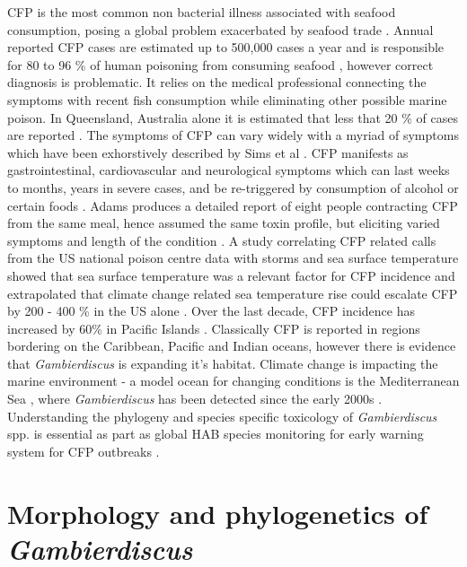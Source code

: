 \documentclass[12pt]{article}
\begin{document}
CFP is the most common non bacterial illness associated with seafood consumption, posing a global problem exacerbated by seafood trade \cite{friedman2008ciguatera}. %
Annual reported CFP cases are estimated up to 500,000 cases a year and is responsible for 80 to 96 \% of human poisoning from consuming seafood \cite{fleming1998seafood,grandjean2008centers}, however correct diagnosis is problematic. It relies on the medical professional connecting the symptoms with recent fish consumption while eliminating other possible marine poison. In Queensland, Australia alone it is estimated that less that 20 \% of cases are reported \cite{lewis2006ciguatera}.
The symptoms of CFP can vary widely with a myriad of symptoms which have been exhorstively described by Sims et al \cite{sims1987theoretical}. CFP manifests as gastrointestinal, cardiovascular and neurological symptoms which can last weeks to months, years in severe cases, and be re-triggered by consumption of alcohol or certain foods \cite{lewis2006ciguatera}. Adams produces a detailed report of eight people contracting CFP from the same meal, hence assumed the same toxin profile, but eliciting varied symptoms and length of the condition \cite{adams1993outbreak}. 
A study correlating CFP related calls from the US national poison centre data with storms and sea surface temperature showed that sea surface temperature was a relevant factor for CFP incidence and extrapolated that climate change related sea temperature rise could escalate CFP by 200 - 400 \% in the US alone \cite{garces2012habitat}. Over the last decade, CFP incidence has increased by 60\% in Pacific Islands \cite{skinner2011ciguatera}.
Classically CFP is reported in regions bordering on the Caribbean, Pacific and Indian oceans, however there is evidence that \emph{Gambierdiscus} is expanding it's habitat. Climate change is impacting the marine environment - a model ocean for changing conditions is the Mediterranean Sea \cite{lejeusne2010climate}, where \emph{Gambierdiscus} has been detected since the early 2000s \cite{aligizaki2008morphological}.
Understanding the phylogeny and species specific toxicology of \emph{Gambierdiscus} spp. is essential as part as global HAB species monitoring for early warning system for CFP outbreaks \cite{berdalet2012global}.


\section{Morphology and phylogenetics of \emph{Gambierdiscus}}
\end{document}

